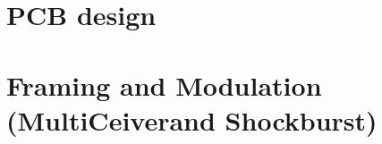 \section{PCB design}

\section{Framing and Modulation (MultiCeiver\texttrademark and Shockburst\texttrademark)}




